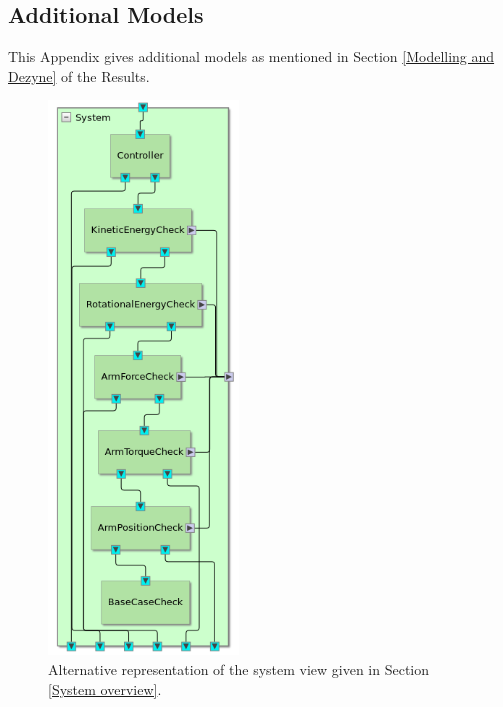 \documentclass[12pt]{scrreprt}
\begin{document}
\begin{appendices}
\chapter{Additional Models}
\label{Additional Models}
This Appendix gives additional models as mentioned in Section \ref{Modelling and Dezyne} of the Results.

\begin{figure}[H]
    \centering
    \includegraphics[width=0.45\textwidth]{Figures/results/modelling_figures/system_view/system_view_alt.png}
    \caption{Alternative representation of the system view given in Section \ref{System overview}.}
    \label{fig:system_view_alt}
\end{figure}



\end{appendices}
\end{document}
